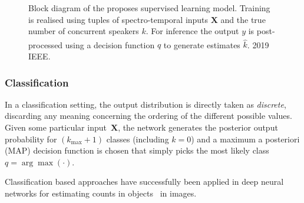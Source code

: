 \begin{figure}[t]
  \centering
  \begin{adjustbox}{width=.8\textwidth}
    
  \end{adjustbox}
\caption{%
Block diagram of the proposes supervised learning model.
Training is realised using tuples of spectro-temporal inputs \(\mathbf{X}\) and
the true number of concurrent speakers \(k\). For inference the output \(y\) is post-processed using a decision function \(q\) to generate estimates \(\hat{k}\). \textsuperscript{\textregistered} 2019 IEEE.
}%
\label{fig:blockdiagram}
\end{figure}

\subsubsection{Classification}
In a classification setting, the output distribution is directly taken as \textit{discrete}, discarding any meaning concerning the ordering of the different possible values.
Given some particular input~$\mathbf{X}$, the network generates the posterior output probability for \((k_{\max} + 1)\) classes (including \(k=0\)) and a maximum a posteriori (MAP) decision function is chosen that simply picks the most likely class \(q = \arg\max(\cdot)\).

Classification based approaches have successfully been applied in deep neural networks for estimating counts in objects~\cite{segui15, zhang2015salient, khan16} in images.

